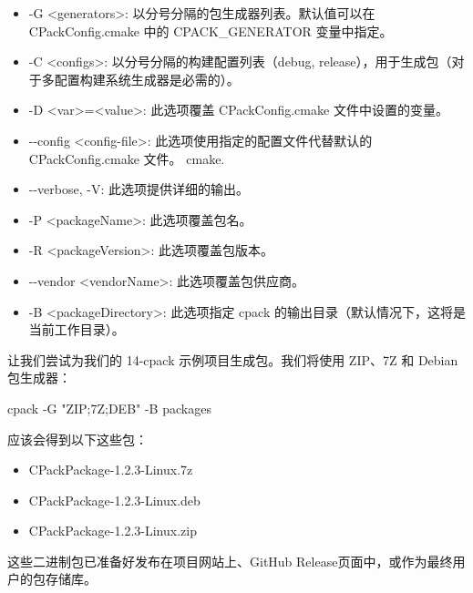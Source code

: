 \begin{itemize}
\item
-G <generators>: 以分号分隔的包生成器列表。默认值可以在 CPackConfig.cmake 中的 CPACK\_GENERATOR 变量中指定。

\item
-C <configs>: 以分号分隔的构建配置列表（debug, release），用于生成包（对于多配置构建系统生成器是必需的）。

\item
-D <var>=<value>: 此选项覆盖 CPackConfig.cmake 文件中设置的变量。

\item
-{}-config <config-file>: 此选项使用指定的配置文件代替默认的 CPackConfig.cmake 文件。
cmake.

\item
-{}-verbose, -V: 此选项提供详细的输出。

\item
-P <packageName>: 此选项覆盖包名。

\item
-R <packageVersion>: 此选项覆盖包版本。

\item
-{}-vendor <vendorName>: 此选项覆盖包供应商。

\item
-B <packageDirectory>: 此选项指定 cpack 的输出目录（默认情况下，这将是当前工作目录）。
\end{itemize}

让我们尝试为我们的 14-cpack 示例项目生成包。我们将使用 ZIP、7Z 和 Debian 包生成器：

\begin{shell}
cpack -G "ZIP;7Z;DEB" -B packages
\end{shell}

应该会得到以下这些包：

\begin{itemize}
\item
CPackPackage-1.2.3-Linux.7z

\item
CPackPackage-1.2.3-Linux.deb

\item
CPackPackage-1.2.3-Linux.zip
\end{itemize}

这些二进制包已准备好发布在项目网站上、GitHub Release页面中，或作为最终用户的包存储库。
